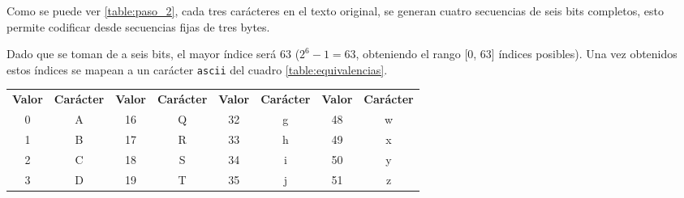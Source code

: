 \documentclass[titlepage,a4paper]{article}
\begin{document}
Como se puede ver \ref{table:paso_2}, cada tres carácteres en el texto original, se generan cuatro secuencias de seis bits completos, esto permite codificar desde secuencias fijas de tres bytes. 

Dado que se toman de a seis bits, el mayor índice será 63 ($2^{6} - 1 = 63$, obteniendo el rango [0, 63] índices posibles). Una vez obtenidos estos índices se mapean a un carácter \verb|ascii| del cuadro \ref{table:equivalencias}.

\begin{table}[H]
\centering
\begin{tabular}{cc|cc|cc|cc}
\rowcolor[HTML]{EAECF0} 
{\color[HTML]{202122} \textbf{Valor}} & {\color[HTML]{202122} \textbf{Carácter}} & {\color[HTML]{202122} \textbf{Valor}} & {\color[HTML]{202122} \textbf{Carácter}} & {\color[HTML]{202122} \textbf{Valor}} & {\color[HTML]{202122} \textbf{Carácter}} & {\color[HTML]{202122} \textbf{Valor}} & {\color[HTML]{202122} \textbf{Carácter}} \\
\rowcolor[HTML]{F8F9FA} 
{\color[HTML]{202122} 0}              & {\color[HTML]{202122} A}                 & {\color[HTML]{202122} 16}             & {\color[HTML]{202122} Q}                 & {\color[HTML]{202122} 32}             & {\color[HTML]{202122} g}                 & {\color[HTML]{202122} 48}             & {\color[HTML]{202122} w}                 \\
\rowcolor[HTML]{F8F9FA} 
{\color[HTML]{202122} 1}              & {\color[HTML]{202122} B}                 & {\color[HTML]{202122} 17}             & {\color[HTML]{202122} R}                 & {\color[HTML]{202122} 33}             & {\color[HTML]{202122} h}                 & {\color[HTML]{202122} 49}             & {\color[HTML]{202122} x}                 \\
\rowcolor[HTML]{F8F9FA} 
{\color[HTML]{202122} 2}              & {\color[HTML]{202122} C}                 & {\color[HTML]{202122} 18}             & {\color[HTML]{202122} S}                 & {\color[HTML]{202122} 34}             & {\color[HTML]{202122} i}                 & {\color[HTML]{202122} 50}             & {\color[HTML]{202122} y}                 \\
\rowcolor[HTML]{F8F9FA} 
{\color[HTML]{202122} 3}              & {\color[HTML]{202122} D}                 & {\color[HTML]{202122} 19}             & {\color[HTML]{202122} T}                 & {\color[HTML]{202122} 35}             & {\color[HTML]{202122} j}                 & {\color[HTML]{202122} 51}             & {\color[HTML]{202122} z}                 \\

\end{tabular}
\end{table}
\end{document}
